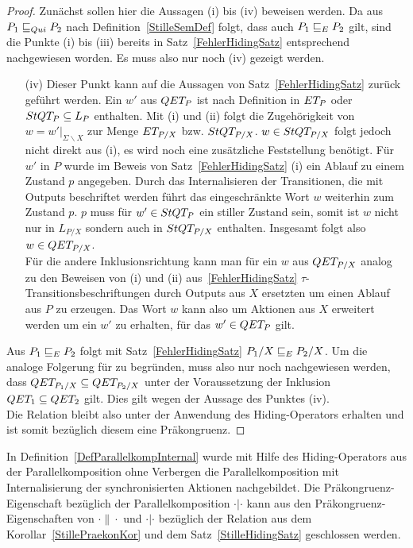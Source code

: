 \begin{proof}
  Zunächst sollen hier die Aussagen (i) bis (iv) beweisen werden. Da aus $P_1
   \sqsubseteq  _{Qui} P_2$ nach Definition~\ref{StilleSemDef} folgt, dass auch $P_1 \sqsubseteq  _E P_2$
  gilt, sind die Punkte (i) bis (iii) bereits in Satz~\ref{FehlerHidingSatz}
  entsprechend nachgewiesen worden. Es muss also nur noch (iv) gezeigt werden.
  \begin{itemize}
    \item[(iv)] Dieser Punkt kann auf die Aussagen von
      Satz~\ref{FehlerHidingSatz} zurück geführt werden. Ein $w'$ aus $QET _P$
      ist nach Definition in $ET _P$ oder $StQT _P \subseteq L_P$ enthalten.
      Mit (i) und (ii) folgt die Zugehörigkeit von $w=w'|_{\Sigma\backslash X}$
      zur Menge $ET _{P/X}$ bzw. $StQT _{P/X}$. $w\in StQT _{P/X}$ folgt
      jedoch nicht direkt aus (i), es wird noch eine zusätzliche Feststellung
      benötigt. Für $w'$ in $P$ wurde im Beweis von Satz~\ref{FehlerHidingSatz}
      (i) ein Ablauf zu einem Zustand $p$ angegeben. Durch das Internalisieren
      der Transitionen, die mit Outputs beschriftet werden führt das
      eingeschränkte Wort $w$ weiterhin zum Zustand $p$. $p$ muss für
      $w'\in StQT _P$ ein stiller Zustand sein, somit ist $w$ nicht nur in $L
      _{P/X}$ sondern auch in $StQT _{P/X}$ enthalten. Insgesamt folgt also
      $w\in QET _{P/X}$.\\
      Für die andere Inklusionsrichtung kann man für ein $w$ aus $QET _{P/X}$
      analog zu den Beweisen von (i) und (ii) aus~\ref{FehlerHidingSatz}
      $\tau$-Transitionsbeschriftungen durch Outputs aus $X$ ersetzten um einen
      Ablauf aus $P$ zu erzeugen. Das Wort $w$ kann also um Aktionen aus $X$
      erweitert werden um ein $w'$ zu erhalten, für das $w'\in QET _P$ gilt.
  \end{itemize}
  Aus $P_1 \sqsubseteq  _E P_2$ folgt mit Satz~\ref{FehlerHidingSatz} $P_1/X \sqsubseteq  _E P_2/X$.
  Um die analoge Folgerung für \QRel{} zu begründen, muss also nur noch
  nachgewiesen werden, dass $QET _{P_1/X} \subseteq QET _{P_2/X}$ unter der
  Voraussetzung der Inklusion $QET _1 \subseteq QET _2$ gilt. Dies gilt wegen
  der Aussage des Punktes (iv).\\
  Die Relation \QRel{} bleibt also unter der Anwendung des Hiding-Operators
  erhalten und ist somit bezüglich diesem eine Präkongruenz.
\end{proof}

In Definition~\ref{DefParallelkompInternal} wurde mit Hilfe des
Hiding-Operators aus der Parallelkomposition ohne Verbergen die
Parallelkomposition mit Internalisierung der synchronisierten Aktionen
nachgebildet. Die Präkongruenz-Eigenschaft bezüglich \QRel{} der
Parallelkomposition $\cdot |\cdot$ kann aus den Präkongruenz-Eigenschaften von
$\cdot\|\cdot$ und $\cdot |\cdot$ bezüglich der Relation \QRel{} aus dem
Korollar~\ref{StillePraekonKor} und dem Satz~\ref{StilleHidingSatz} geschlossen
werden.
